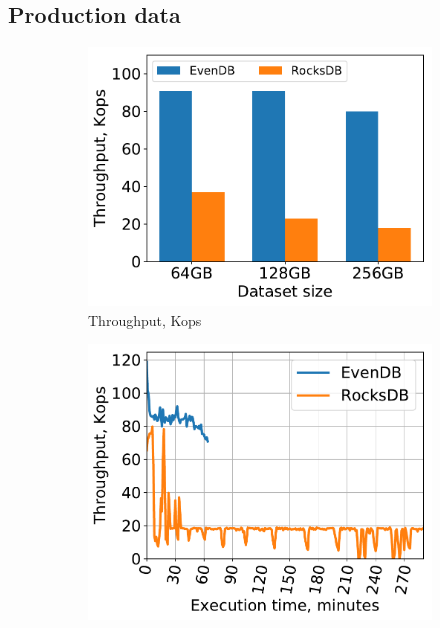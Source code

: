 
\subsection{Production data}
\label{ssec:prod}

\begin{figure}[tb]
\centering
\begin{subfigure}{0.29\linewidth}
\includegraphics[width=\textwidth]{figs/ingestion.pdf}
\caption{Throughput, Kops}
\label{fig:prod:ingestion:a}
\end{subfigure}
\hspace{0.03\linewidth} 
\begin{subfigure}{0.29\linewidth}
\includegraphics[width=\textwidth]{figs/throughput_256_ingestions_line.pdf}

\end{subfigure}
\end{figure}
